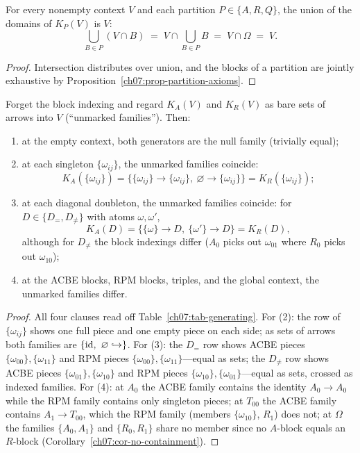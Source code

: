 \begin{proposition}\label{ch07:prop-exhaustive}
For every nonempty context $V$ and each partition $P\in\{A,R,Q\}$, the union of the domains of $K_{P}(V)$ is $V$:
\[
\bigcup_{B\in P}(V\cap B)\;=\;V\cap\bigcup_{B\in P}B\;=\;V\cap\Omega\;=\;V .
\]
\end{proposition}

\begin{proof}
Intersection distributes over union, and the blocks of a partition are jointly exhaustive by Proposition~\ref{ch07:prop-partition-axioms}.
\end{proof}

\begin{proposition}\label{ch07:prop-coincidence}
Forget the block indexing and regard $K_{A}(V)$ and $K_{R}(V)$ as bare sets of arrows into $V$ (``unmarked families''). Then:
\begin{enumerate}
\item at the empty context, both generators are the null family (trivially equal);
\item at each singleton $\{\omega_{ij}\}$, the unmarked families coincide:
\[
K_{A}(\{\omega_{ij}\})=\bigl\{\{\omega_{ij}\}\to\{\omega_{ij}\},\ \varnothing\to\{\omega_{ij}\}\bigr\}=K_{R}(\{\omega_{ij}\});
\]
\item at each diagonal doubleton, the unmarked families coincide: for $D\in\{D_{=},D_{\neq}\}$ with atoms $\omega,\omega'$,
\[
K_{A}(D)=\bigl\{\{\omega\}\to D,\ \{\omega'\}\to D\bigr\}=K_{R}(D),
\]
although for $D_{\neq}$ the block indexings differ ($A_{0}$ picks out $\omega_{01}$ where $R_{0}$ picks out $\omega_{10}$);
\item at the ACBE blocks, RPM blocks, triples, and the global context, the unmarked families differ.
\end{enumerate}
\end{proposition}

\begin{proof}
All four clauses read off Table~\ref{ch07:tab-generating}. For (2): the row of $\{\omega_{ij}\}$ shows one full piece and one empty piece on each side; as sets of arrows both families are $\{\id,\ \varnothing\hookrightarrow\}$. For (3): the $D_{=}$ row shows ACBE pieces $\{\omega_{00}\},\{\omega_{11}\}$ and RPM pieces $\{\omega_{00}\},\{\omega_{11}\}$---equal as sets; the $D_{\neq}$ row shows ACBE pieces $\{\omega_{01}\},\{\omega_{10}\}$ and RPM pieces $\{\omega_{10}\},\{\omega_{01}\}$---equal as sets, crossed as indexed families. For (4): at $A_{0}$ the ACBE family contains the identity $A_{0}\to A_{0}$ while the RPM family contains only singleton pieces; at $T_{00}$ the ACBE family contains $A_{1}\to T_{00}$, which the RPM family (members $\{\omega_{10}\}$, $R_{1}$) does not; at $\Omega$ the families $\{A_{0},A_{1}\}$ and $\{R_{0},R_{1}\}$ share no member since no $A$-block equals an $R$-block (Corollary~\ref{ch07:cor-no-containment}).
\end{proof}


